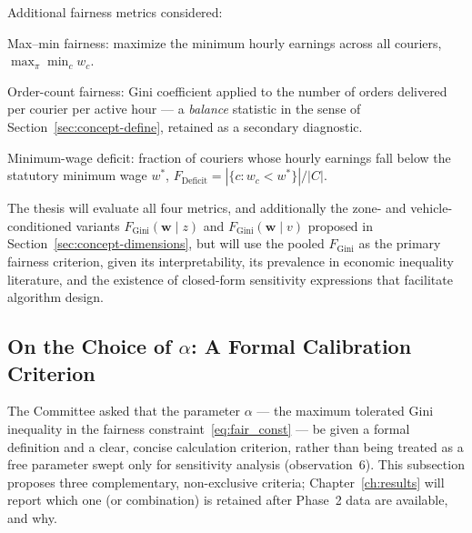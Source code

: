 \documentclass[12pt,a4paper]{report}
\begin{document}
\noindent Additional fairness metrics considered:

\begin{description}[leftmargin=3.5cm,style=nextline]
    \item[$F_{\text{MaxMin}}$] Max--min fairness: maximize the minimum hourly earnings across all couriers, $\max_{\pi} \min_c w_c$.
    \item[$F_{\text{Orders}}$] Order-count fairness: Gini coefficient applied to the number of orders delivered per courier per active hour --- a \emph{balance} statistic in the sense of Section~\ref{sec:concept-define}, retained as a secondary diagnostic.
    \item[$F_{\text{Deficit}}$] Minimum-wage deficit: fraction of couriers whose hourly earnings fall below the statutory minimum wage $w^*$,
        $F_{\text{Deficit}} = |\{c : w_c < w^*\}| / |C|$.
\end{description}

The thesis will evaluate all four metrics, and additionally the zone- and vehicle-conditioned variants $F_{\text{Gini}}(\mathbf{w} \mid z)$ and $F_{\text{Gini}}(\mathbf{w} \mid v)$ proposed in Section~\ref{sec:concept-dimensions}, but will use the pooled $F_{\text{Gini}}$ as the primary fairness criterion, given its interpretability, its prevalence in economic inequality literature, and the existence of closed-form sensitivity expressions that facilitate algorithm design.

\subsection{On the Choice of \texorpdfstring{$\alpha$}{alpha}: A Formal Calibration Criterion}
\label{sec:alpha}

The Committee asked that the parameter $\alpha$ --- the maximum tolerated Gini inequality in the fairness constraint~\eqref{eq:fair_const} --- be given a formal definition and a clear, concise calculation criterion, rather than being treated as a free parameter swept only for sensitivity analysis (observation~6). This subsection proposes three complementary, non-exclusive criteria; Chapter~\ref{ch:results} will report which one (or combination) is retained after Phase~2 data are available, and why.
\end{document}
